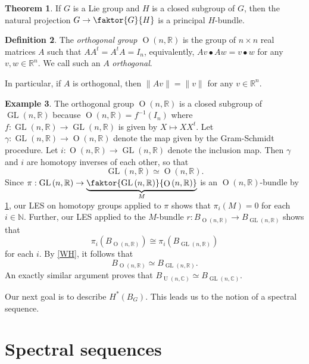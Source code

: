 \documentclass[10pt,letterpaper,cm]{nupset}
\theoremstyle{definition}
\newtheorem{defn}{Definition}[subsection]
\newtheorem{exmp}[defn]{Example}
\theoremstyle{theorem}
\newtheorem{theorem}[defn]{Theorem}
\theoremstyle{remark}
\newcommand{\C}{\mathbb C}
\newcommand{\N}{\mathbb N}
\newcommand{\R}{\mathbb{R}}
\newcommand{\1}{\mathbb{1}}
\newcommand{\0}{\vec 0}
\DeclareMathOperator{\GL}{GL}
\DeclareMathOperator{\Or}{O}
\DeclareMathOperator{\Un}{U}
\begin{document}
\begin{theorem}\label{H-bund}
If $G$ is a Lie group and $H$ is a closed subgroup of $G$, then the natural projection $G \to \faktor{G}{H}$ is a principal $H$-bundle. 
\end{theorem}

\begin{defn}
The \textit{orthogonal group $\Or\left(n, \R\right)$} is the group of $n\times n$ real matrices $A$ such that $AA^t = A^tA = I_n$, equivalently, $Av \bullet Aw = v\bullet w$ for any $v,w\in \R^n$. We call such an $A$ \textit{orthogonal}.
\end{defn}

In particular, if $A$ is orthogonal, then $\|Av\| = \|v\|$ for any $v\in \R^n$.

\begin{exmp}
The orthogonal group $\Or\left(n, \R\right)$ is a closed subgroup of $\GL\left(n, \R\right)$ because  $\Or\left(n, \R\right)= f^{-1}\left(I_n\right)$ where $f: \GL\left(n, \R\right) \to \GL\left(n, \R\right)$ is given by $X \mapsto XX^t$. Let $\gamma : \GL\left(n, \R\right) \to \Or\left(n, \R\right)$ denote the map given by the Gram-Schmidt procedure. Let $i : \Or\left(n, \R\right) \to \GL\left(n, \R\right)$ denote the inclusion map. Then $\gamma$ and $i$ are homotopy inverses of each other, so that 
\[
\GL\left(n, \R\right) \simeq \Or\left(n, \R\right).
\]  Since $\pi : \GL\left(n, \R\right) \to \underbrace{\faktor{\GL\left(n, \R\right) }{\Or\left(n, \R\right)}}_{M}$ is an $\Or\left(n, \R\right)$-bundle by \cref{H-bund}, our LES on homotopy groups applied to $\pi$ shows that $\pi_i\left(M\right) =0$ for each $i\in \N$. Further, our LES  applied to the $M$-bundle $r: B_{\Or\left(n, \R\right)} \to B_{\GL\left(n, \R\right)}$ shows that $$\pi_i\left(B_{\Or\left(n, \R\right)}\right) \cong \pi_i\left(B_{\GL\left(n, \R\right)}\right)$$ for each $i$. By \cref{WH}, it follows that 
\[
B_{\Or\left(n, \R\right)} \simeq B_{\GL\left(n, \R\right)}
.\] An exactly similar argument proves that $B_{\Un\left(n, \C\right)} \simeq B_{\GL\left(n, \C\right)}$.
\end{exmp}

Our next goal is to describe $H^{\ast}\left(B_G\right)$. This leads us to the notion of a spectral sequence. 

\section{Spectral sequences}
\end{document}
